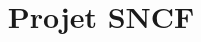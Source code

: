 \documentclass[a4paper,landscape,twocolumn, 11pt,DIV=30]{scrartcl}
\begin{document}
\date{}
\title{Projet SNCF}




\end{document}
